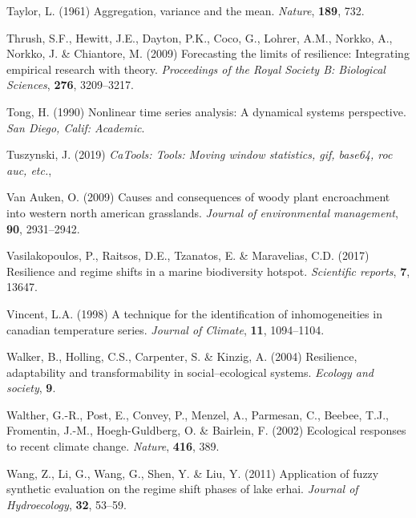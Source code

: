 \documentclass[print]{nuthesis}
\begin{document}
\leavevmode\hypertarget{ref-taylor1961aggregation}{}%
Taylor, L. (1961) Aggregation, variance and the mean. \emph{Nature}, \textbf{189}, 732.

\leavevmode\hypertarget{ref-thrush2009forecasting}{}%
Thrush, S.F., Hewitt, J.E., Dayton, P.K., Coco, G., Lohrer, A.M., Norkko, A., Norkko, J. \& Chiantore, M. (2009) Forecasting the limits of resilience: Integrating empirical research with theory. \emph{Proceedings of the Royal Society B: Biological Sciences}, \textbf{276}, 3209--3217.

\leavevmode\hypertarget{ref-tong1990nonlinear}{}%
Tong, H. (1990) Nonlinear time series analysis: A dynamical systems perspective. \emph{San Diego, Calif: Academic}.

\leavevmode\hypertarget{ref-caTools}{}%
Tuszynski, J. (2019) \emph{CaTools: Tools: Moving window statistics, gif, base64, roc auc, etc.},

\leavevmode\hypertarget{ref-van2009causes}{}%
Van Auken, O. (2009) Causes and consequences of woody plant encroachment into western north american grasslands. \emph{Journal of environmental management}, \textbf{90}, 2931--2942.

\leavevmode\hypertarget{ref-vasilakopoulos2017resilience}{}%
Vasilakopoulos, P., Raitsos, D.E., Tzanatos, E. \& Maravelias, C.D. (2017) Resilience and regime shifts in a marine biodiversity hotspot. \emph{Scientific reports}, \textbf{7}, 13647.

\leavevmode\hypertarget{ref-vincent1998technique}{}%
Vincent, L.A. (1998) A technique for the identification of inhomogeneities in canadian temperature series. \emph{Journal of Climate}, \textbf{11}, 1094--1104.

\leavevmode\hypertarget{ref-walker2004resilience}{}%
Walker, B., Holling, C.S., Carpenter, S. \& Kinzig, A. (2004) Resilience, adaptability and transformability in social--ecological systems. \emph{Ecology and society}, \textbf{9}.

\leavevmode\hypertarget{ref-walther_ecological_2002}{}%
Walther, G.-R., Post, E., Convey, P., Menzel, A., Parmesan, C., Beebee, T.J., Fromentin, J.-M., Hoegh-Guldberg, O. \& Bairlein, F. (2002) Ecological responses to recent climate change. \emph{Nature}, \textbf{416}, 389.

\leavevmode\hypertarget{ref-wang2011application}{}%
Wang, Z., Li, G., Wang, G., Shen, Y. \& Liu, Y. (2011) Application of fuzzy synthetic evaluation on the regime shift phases of lake erhai. \emph{Journal of Hydroecology}, \textbf{32}, 53--59.
\end{document}
